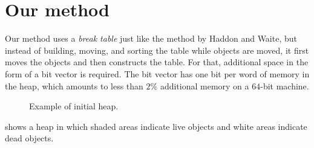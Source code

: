 \section{Our method}

Our method uses a \emph{break table} just like the method by Haddon
and Waite, but instead of building, moving, and sorting the table
while objects are moved, it first moves the objects and then
constructs the table.  For that, additional space in the form of a bit
vector is required.  The bit vector has one bit per word of memory in
the heap, which amounts to less than $2$\% additional memory on a
$64$-bit machine. 

\begin{figure}
\begin{center}
\end{center}
\caption{\label{fig-example-a}
Example of initial heap.}
\end{figure}

 shows a heap in which shaded areas indicate
live objects and white areas indicate dead objects.

